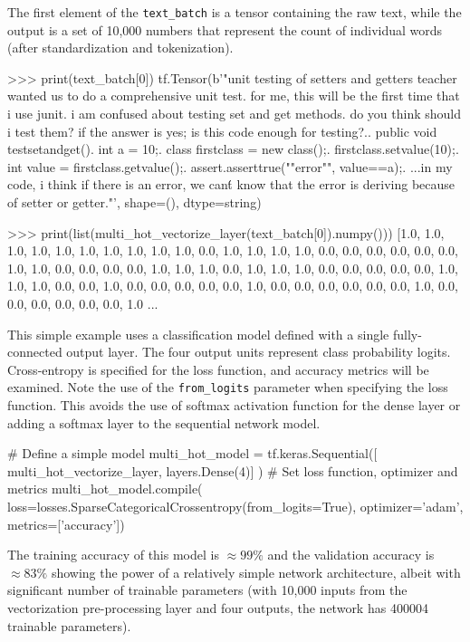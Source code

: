 The first element of the \texttt{text\_batch} is a tensor containing the raw text, while the output is a set of 10,000 numbers that represent the count of individual words (after standardization and tokenization).

\begin{textcode}
>>> print(text_batch[0])
tf.Tensor(b'"unit testing of setters and getters teacher wanted us 
to do a comprehensive unit test. for me, this will be the first time 
that i use junit. i am confused about testing set and get methods. 
do you think should i test them? if the answer is yes; is this code 
enough for testing?..  public void testsetandget(){.    int a = 10;.    
class firstclass = new class();.    firstclass.setvalue(10);.    int
value = firstclass.getvalue();.    assert.asserttrue(""error"", 
value==a);.  }...in my code, i think if there is an error, we can\'t
know that the error is deriving because of setter or getter."\n', 
shape=(), dtype=string)

>>> print(list(multi_hot_vectorize_layer(text_batch[0]).numpy()))
[1.0, 1.0, 1.0, 1.0, 1.0, 1.0, 1.0, 1.0, 1.0, 1.0, 0.0, 1.0, 1.0, 
1.0, 1.0, 0.0, 0.0, 0.0, 0.0, 0.0, 0.0, 1.0, 1.0, 0.0, 0.0, 0.0, 
0.0, 1.0, 1.0, 1.0, 0.0, 1.0, 1.0, 1.0, 0.0, 0.0, 0.0, 0.0, 0.0, 
1.0, 1.0, 1.0, 0.0, 0.0, 1.0, 0.0, 0.0, 0.0, 0.0, 0.0, 1.0, 0.0, 
0.0, 0.0, 0.0, 0.0, 0.0, 1.0, 0.0, 0.0, 0.0, 0.0, 0.0, 0.0, 1.0
...
\end{textcode}

This simple example uses a classification model defined with a single fully-connected output layer. The four output units represent class probability logits. Cross-entropy is specified for the loss function, and accuracy metrics will be examined. Note the use of the \texttt{from\_logits} parameter when specifying the loss function. This avoids the use of softmax activation function for the dense layer or adding a softmax layer to the sequential network model.

\begin{pythoncode}
# Define a simple model
multi_hot_model = tf.keras.Sequential([
    multi_hot_vectorize_layer,
    layers.Dense(4)]
)
# Set loss function, optimizer and metrics
multi_hot_model.compile(
    loss=losses.SparseCategoricalCrossentropy(from_logits=True),
    optimizer='adam', metrics=['accuracy'])
\end{pythoncode}

The training accuracy of this model is $\approx 99\%$ and the validation accuracy is $\approx 83\%$ showing the power of a relatively simple network architecture, albeit with significant number of trainable parameters (with 10,000 inputs from the vectorization pre-processing layer and four outputs, the network has 400004 trainable parameters).

